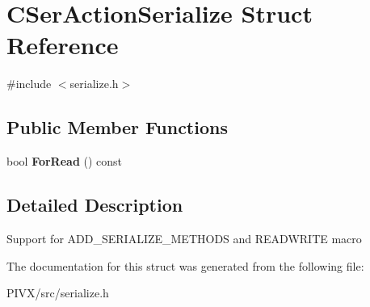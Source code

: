 \hypertarget{struct_c_ser_action_serialize}{}\section{C\+Ser\+Action\+Serialize Struct Reference}
\label{struct_c_ser_action_serialize}


{\ttfamily \#include $<$serialize.\+h$>$}

\subsection*{Public Member Functions}
\begin{DoxyCompactItemize}
\item 
\mbox{\label{struct_c_ser_action_serialize_a3facaa35d0ba0b175c647b5409d2bde8}} 
bool {\bfseries For\+Read} () const
\end{DoxyCompactItemize}


\subsection{Detailed Description}
Support for A\+D\+D\+\_\+\+S\+E\+R\+I\+A\+L\+I\+Z\+E\+\_\+\+M\+E\+T\+H\+O\+DS and R\+E\+A\+D\+W\+R\+I\+TE macro 

The documentation for this struct was generated from the following file\+:\begin{DoxyCompactItemize}
\item 
P\+I\+V\+X/src/serialize.\+h\end{DoxyCompactItemize}
